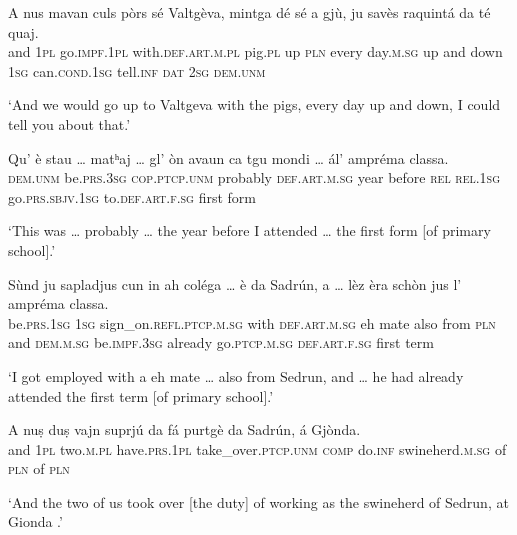 \begin{linenumbers}
\gll    A nus mavan culs pòrs sé Valtgèva, mintga dé sé a gjù, ju savès raquintá da té quaj.\\
and \textsc{1pl}  go.\textsc{impf.1pl} with.\textsc{def.art.m.pl} pig.\textsc{pl} up \textsc{pln} every day.\textsc{m.sg} up and down  \textsc{1sg}  can.\textsc{cond.1sg}  tell.\textsc{inf}  \textsc{dat}  \textsc{2sg} \textsc{dem.unm}\\
\end{linenumbers}
\medskip
\glt `And we would go up to Valtgeva with the pigs, every day up and down, I could tell you about that.'
\medskip

\begin{linenumbers}
\gll    Qu’ è stau … matʰaj … gl' òn avaun ca tgu mondi … ál’ ampréma classa.\\
 \textsc{dem.unm} be.\textsc{prs.3sg} \textsc{cop.ptcp.unm} {} probably {} \textsc{def.art.m.sg} year before \textsc{rel} \textsc{rel.1sg} go.\textsc{prs.sbjv.1sg} {}   to.\textsc{def.art.f.sg} first form\\
\end{linenumbers}
\medskip
\glt `This was … probably … the year before I attended … the first form [of primary school].'
\medskip

\begin{linenumbers}
\gll    Sùnd ju sapladjus cun in ah coléga … è da Sadrún, a … lèz èra schòn jus l’ ampréma classa.\\
 be.\textsc{prs.1sg} \textsc{1sg} sign\_on.\textsc{refl.ptcp.m.sg} with \textsc{def.art.m.sg} eh mate {} also from \textsc{pln} and {} \textsc{dem.m.sg}  be.\textsc{impf.3sg} already go.\textsc{ptcp.m.sg} \textsc{def.art.f.sg} first term\\
\end{linenumbers}
\medskip
\glt `I got employed with a eh mate … also from Sedrun, and … he had already attended the first term [of primary school].'
\medskip

\begin{linenumbers}
	\gll    A nuṣ duṣ vajn suprjú da fá purtgè da Sadrún, á Gjònda.\\
	and \textsc{1pl} two.\textsc{m.pl} have.\textsc{prs.1pl} take\_over.\textsc{ptcp.unm}  \textsc{comp} do.\textsc{inf}  swineherd.\textsc{m.sg} of  \textsc{pln} of \textsc{pln}\\
\end{linenumbers}
\medskip
\glt `And the two of us took over [the duty] of working as the swineherd of Sedrun, at Gionda .'
\medskip

